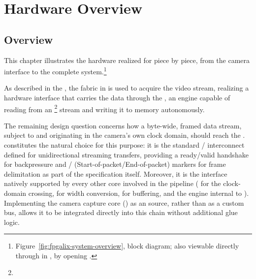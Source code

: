 \chapter{Hardware Overview}
\label{chap:fpgalix-hw-overview}

\section{Overview}
\label{sec:fpgalix-overview}

This chapter illustrates the hardware realized for  piece by piece, from the  camera interface to the complete system.\footnote{Figure~\ref{fig:fpgalix-system-overview},  block diagram; also viewable directly through  in , by opening .}

As described in the , the  fabric in  is used to acquire the video stream, realizing a hardware interface that carries the data through the   \cite{EP-IPUG}, an   engine capable of reading from an \footnote{} stream and writing it to memory autonomously.

The remaining design question concerns how a byte-wide, framed data stream, subject to  and originating in the camera's own clock domain, should reach the . ~\cite{AVALON-SPEC} constitutes the natural choice for this purpose: it is the standard / interconnect defined for unidirectional streaming transfers, providing a ready/valid handshake for backpressure and / (Start-of-packet/End-of-packet) markers for frame delimitation as part of the specification itself. Moreover, it is the interface natively supported by every other  core involved in the pipeline ( for the clock-domain crossing,  for width conversion,  for buffering, and the  engine internal to ). Implementing the camera capture core () as an  source, rather than as a custom bus, allows it to be integrated directly into this chain without additional glue logic.


